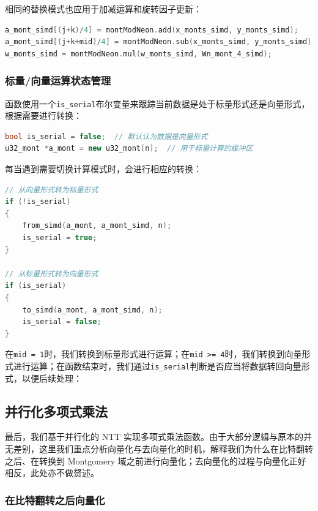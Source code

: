 \documentclass[a4paper]{article}
\begin{document}
相同的替换模式也应用于加减运算和旋转因子更新：

\begin{lstlisting}[language=C++]
a_mont_simd[(j+k)/4] = montModNeon.add(x_monts_simd, y_monts_simd);
a_mont_simd[(j+k+mid)/4] = montModNeon.sub(x_monts_simd, y_monts_simd);
w_monts_simd = montModNeon.mul(w_monts_simd, Wn_mont_4_simd);
\end{lstlisting}

\subsubsection{标量/向量运算状态管理}

函数使用一个\texttt{is\_serial}布尔变量来跟踪当前数据是处于标量形式还是向量形式，根据需要进行转换：

\begin{lstlisting}[language=C++]
bool is_serial = false;  // 默认认为数据是向量形式
u32_mont *a_mont = new u32_mont[n];  // 用于标量计算的缓冲区
\end{lstlisting}

每当遇到需要切换计算模式时，会进行相应的转换：

\begin{lstlisting}[language=C++]
// 从向量形式转为标量形式
if (!is_serial)
{
    from_simd(a_mont, a_mont_simd, n);
    is_serial = true;
}

// 从标量形式转为向量形式
if (is_serial)
{
    to_simd(a_mont, a_mont_simd, n);
    is_serial = false;
}
\end{lstlisting}

在\texttt{mid = 1}时，我们转换到标量形式进行运算；在\texttt{mid >= 4}时，我们转换到向量形式进行运算；在函数结束时，我们通过\texttt{is\_serial}判断是否应当将数据转回向量形式，以便后续处理：

\subsection{并行化多项式乘法}

最后，我们基于并行化的 NTT 实现多项式乘法函数。由于大部分逻辑与原本的并无差别，这里我们重点分析向量化与去向量化的时机，解释我们为什么在比特翻转之后、在转换到 Montgomery 域之前进行向量化；去向量化的过程与向量化正好相反，此处亦不做赘述。

\subsubsection{在比特翻转之后向量化}
\end{document}
